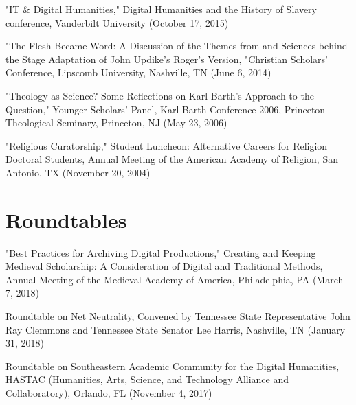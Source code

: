 \documentclass[10pt]{res} %
\begin{document}
\begin{resume}
\begin{hangparas}{.25in}{1}"\href{https://my.vanderbilt.edu/digitalhumanities/files/2015/10/Digital-Humanities-and-the-History-of-Slavery-3.jpg}{IT \& Digital Humanities}," Digital Humanities and the History of Slavery conference, Vanderbilt University (October 17, 2015)\end{hangparas}

\begin{hangparas}{.25in}{1}"The Flesh Became Word: A Discussion of the Themes from and Sciences behind the Stage Adaptation of John Updike's Roger's Version, "Christian Scholars’ Conference, Lipscomb University, Nashville, TN (June 6, 2014)\end{hangparas}

\begin{hangparas}{.25in}{1}"Theology as Science? Some Reflections on Karl Barth’s Approach to the Question," Younger Scholars' Panel, Karl Barth Conference 2006, Princeton Theological Seminary, Princeton, NJ (May 23, 2006)\end{hangparas}

\begin{hangparas}{.25in}{1}"Religious Curatorship," Student Luncheon: Alternative Careers for Religion Doctoral Students, Annual Meeting of the American Academy of Religion, San Antonio, TX (November 20, 2004)\end{hangparas}

\section{Roundtables}

\begin{hangparas}{.25in}{1}"Best Practices for Archiving Digital Productions," Creating and Keeping Medieval Scholarship: A Consideration of Digital and Traditional Methods, Annual Meeting of the Medieval Academy of America, Philadelphia, PA (March 7, 2018)\end{hangparas}

\begin{hangparas}{.25in}{1}Roundtable on Net Neutrality, Convened by Tennessee State Representative John Ray Clemmons and Tennessee State Senator Lee Harris, Nashville, TN (January 31, 2018)\end{hangparas}

\begin{hangparas}{.25in}{1}Roundtable on Southeastern Academic Community for the Digital Humanities, HASTAC (Humanities, Arts, Science, and Technology Alliance and Collaboratory), Orlando, FL (November 4, 2017)\end{hangparas}


\end{resume}
\end{document}
